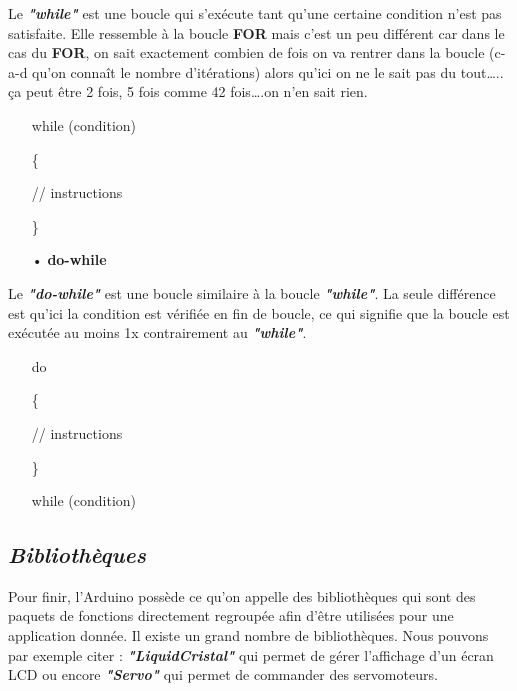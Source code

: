 \documentclass[12pt,a4paper]{article}
\begin{document}
\bigskip
Le \textit{\textbf{"while"}} est une boucle qui s’exécute tant qu’une certaine condition n’est pas satisfaite. Elle ressemble à la boucle \textbf{FOR} mais c’est un peu différent car dans le cas du \textbf{FOR}, on sait exactement combien de fois on va rentrer dans la boucle (c-a-d qu’on connaît le nombre d’itérations)  alors qu’ici on ne le sait pas du tout….. ça peut être 2 fois, 5 fois comme 42 fois….on n’en sait rien. 


\bigskip
\bigskip
\begin{itemize}
     \item[] while (condition)
    \item[]  \{
    \item[] // instructions
    \item[]  \}
\end{itemize}

\begin{itemize}
\bigskip
   \item[•] \Large{\textbf{do-while}}
\end{itemize}

\bigskip
Le \textit{\textbf{"do-while"}} est une boucle similaire à la boucle \textit{\textbf{"while"}}. La seule différence est qu’ici la condition est vérifiée en fin de boucle, ce qui signifie que la boucle est exécutée au moins 1x contrairement au \textit{\textbf{"while"}}.

\bigskip
\begin{itemize}
     \item[] do
    \item[]  \{
    \item[] // instructions
    \item[]  \}
    \item[] while (condition)
\end{itemize}

\newpage
\subsection{\textit{\textbf{Bibliothèques}}}

Pour finir, l’Arduino possède ce qu’on appelle des bibliothèques qui sont des paquets de fonctions directement regroupée afin d’être utilisées pour une application donnée. Il existe un grand nombre de bibliothèques. Nous pouvons par exemple citer : \textit{\textbf{"LiquidCristal"}} qui permet de gérer l’affichage d’un écran LCD ou encore \textit{\textbf{"Servo"}} qui permet de commander des servomoteurs.
\end{document}
